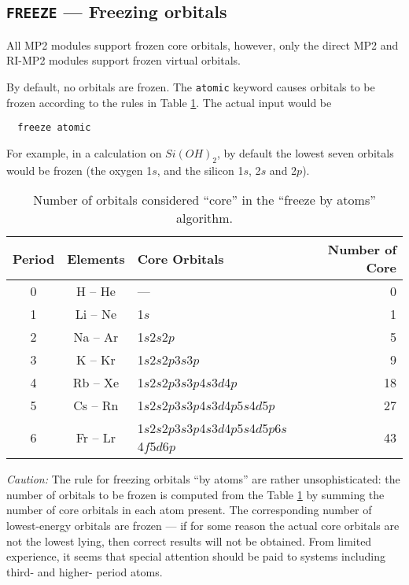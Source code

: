 \subsection{{\tt FREEZE} --- Freezing orbitals}
\label{mp2:core}

All MP2 modules support frozen core orbitals, however, only the direct
MP2 and RI-MP2 modules support frozen virtual orbitals. 

By default, no orbitals are frozen.  The \verb+atomic+ keyword causes
orbitals to be frozen according to the rules in Table
\ref{tbl:freeze-by-atoms}.  The actual input would be
\begin{verbatim}
  freeze atomic
\end{verbatim}
For example, in a calculation on $Si(OH)_2$, by default the lowest
seven orbitals would be frozen (the oxygen 1$s$, and the silicon 1$s$,
2$s$ and 2$p$).

\begin{table}[htbp]
\label{tbl:freeze-by-atoms}

\center

\begin{tabular}{cclr}
\hline\hline
Period & Elements & Core Orbitals & Number of Core \\
\hline
0 & H -- He  & ---                                          &  0 \\
1 & Li -- Ne & 1$s$                                         &  1 \\
2 & Na -- Ar & 1$s$2$s$2$p$                                 &  5 \\
3 & K -- Kr  & 1$s$2$s$2$p$3$s$3$p$                         &  9 \\
4 & Rb -- Xe & 1$s$2$s$2$p$3$s$3$p$4$s$3$d$4$p$             & 18 \\
5 & Cs -- Rn & 1$s$2$s$2$p$3$s$3$p$4$s$3$d$4$p$5$s$4$d$5$p$ & 27 \\
6 & Fr -- Lr & 1$s$2$s$2$p$3$s$3$p$4$s$3$d$4$p$5$s$4$d$5$p$6$s$4$f$5$d$6$p$
     & 43 \\
\hline\hline
\end{tabular}

\caption{Number of orbitals considered ``core'' in the ``freeze by
atoms'' algorithm.}

\end{table}

{\em Caution:\/} The rule for freezing orbitals ``by atoms'' are
rather unsophisticated: the number of orbitals to be frozen is
computed from the Table \ref{tbl:freeze-by-atoms} by summing the number
of core orbitals in each atom present.  The corresponding number of
lowest-energy orbitals are frozen --- if for some reason the actual
core orbitals are not the lowest lying, then correct results will not
be obtained.  From limited experience, it seems that special attention
should be paid to systems including third- and higher- period atoms.

